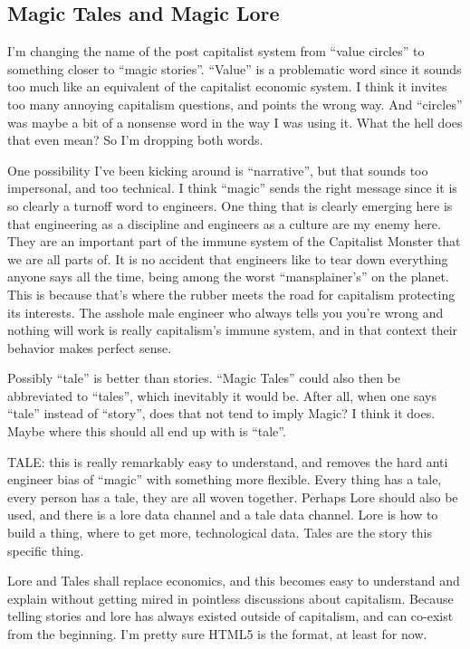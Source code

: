 \subsection{Magic Tales and Magic
Lore}\label{magic-tales-and-magic-lore}

I'm changing the name of the post capitalist system from ``value
circles'' to something closer to ``magic stories''. ``Value'' is a
problematic word since it sounds too much like an equivalent of the
capitalist economic system. I think it invites too many annoying
capitalism questions, and points the wrong way. And ``circles'' was
maybe a bit of a nonsense word in the way I was using it. What the hell
does that even mean? So I'm dropping both words.

One possibility I've been kicking around is ``narrative'', but that
sounds too impersonal, and too technical. I think ``magic'' sends the
right message since it is so clearly a turnoff word to engineers. One
thing that is clearly emerging here is that engineering as a discipline
and engineers as a culture are my enemy here. They are an important part
of the immune system of the Capitalist Monster that we are all parts of.
It is no accident that engineers like to tear down everything anyone
says all the time, being among the worst ``mansplainer's'' on the
planet. This is because that's where the rubber meets the road for
capitalism protecting its interests. The asshole male engineer who
always tells you you're wrong and nothing will work is really
capitalism's immune system, and in that context their behavior makes
perfect sense.

Possibly ``tale'' is better than stories. ``Magic Tales'' could also
then be abbreviated to ``tales'', which inevitably it would be. After
all, when one says ``tale'' instead of ``story'', does that not tend to
imply Magic? I think it does. Maybe where this should all end up with is
``tale''.

TALE: this is really remarkably easy to understand, and removes the hard
anti engineer bias of ``magic'' with something more flexible. Every
thing has a tale, every person has a tale, they are all woven together.
Perhaps Lore should also be used, and there is a lore data channel and a
tale data channel. Lore is how to build a thing, where to get more,
technological data. Tales are the story this specific thing.

Lore and Tales shall replace economics, and this becomes easy to
understand and explain without getting mired in pointless discussions
about capitalism. Because telling stories and lore has always existed
outside of capitalism, and can co-exist from the beginning. I'm pretty
sure HTML5 is the format, at least for now.

